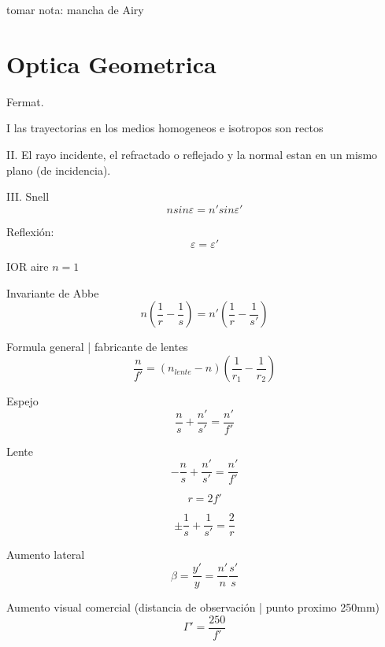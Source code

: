 \documentclass[12pt, letterpaper, twoside]{article}
\begin{document}
	tomar nota: mancha de Airy
	
	\section{Optica Geometrica}
	
	Fermat.
	
	I las trayectorias en los medios homogeneos e isotropos son rectos
	
	II. El rayo incidente, el refractado o reflejado y la normal estan en un mismo plano (de incidencia).
	
	III. Snell
	\begin{equation}
		n sin \varepsilon = n' sin \varepsilon'
	\end{equation}

	Reflexión: 
	\begin{equation}
		\varepsilon = \varepsilon'
	\end{equation}
	
	IOR aire $n = 1$

	Invariante de Abbe
	\begin{equation}
		n ( \frac{1}{r} - \frac{1}{s} ) = n' (\frac{1}{r} - \frac{1}{s'} )
	\end{equation}

	Formula general | fabricante de lentes	
	\begin{equation}
		\frac{n}{f'} = (n_{lente} - n)(\frac{1}{r_1} - \frac{1}{r_2})
	\end{equation}

	Espejo
	\begin{equation}
		\frac{n}{s} + \frac{n'}{s'} = \frac{n'}{f'}
	\end{equation}

	Lente
	\begin{equation}
		-\frac{n}{s} + \frac{n'}{s'} = \frac{n'}{f'}
	\end{equation}

	\begin{equation}
		r = 2f'
	\end{equation}

	\begin{equation}
		\pm \frac{1}{s} + \frac{1}{s'} = \frac{2}{r}
	\end{equation}
	
	Aumento lateral
	\begin{equation}
		\beta = \frac{y'}{y} = \frac{n'}{n} \frac{s'}{s}
	\end{equation}

	Aumento visual comercial (distancia de observación | punto proximo 250mm)
	\begin{equation}
		\Gamma' = \frac{250}{f'}
	\end{equation}
	
\end{document}
